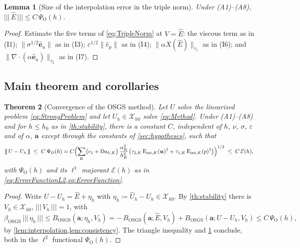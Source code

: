 \documentclass[11pt]{article}
\newtheorem{theorem}{Theorem}[section]
\newtheorem{lemma}[theorem]{Lemma}
\theoremstyle{remark}
\newcommand{\bu}{\boldsymbol{u}}
\newcommand{\ba}{\boldsymbol{a}}
\newcommand{\norm}[1]{\lVert #1 \rVert}
\newcommand{\tnorm}[1]{\lvert\!\lvert\!\lvert\, #1 \,\rvert\!\rvert\!\rvert}
\newcommand{\Eint}[2]{\mathrm{E}_{\mathrm{int},#1}(#2)}
\newcommand{\Dah}{\mathrm{Da}_{h,K}}
\newcommand{\Xhz}{\mathcal{X}_{h0}}
\begin{document}
\begin{lemma}[Size of the interpolation error in the triple norm]
\label{lem:interpsize}
Under \textup{(A1)--(A8)},
$\tnorm{\hat E} \le C\,\Psi_{\mathrm O}(h)$.
\end{lemma}

\begin{proof}
Estimate the five terms of \cref{eq:TripleNorm} at $V = \hat E$: the viscous term as
in (I1); $\norm{\sigma^{1/2}\hat{\boldsymbol e}_u}$ as in (I3);
$\varepsilon^{1/2}\norm{\hat e_p}$ as in (I4);
$\norm{\alpha X(\hat E)}_{\tau_1}$ as in (I6); and
$\norm{\nabla\cdot(\alpha\hat{\boldsymbol e}_u)}_{\tau_2}$ as in (I7).
\end{proof}

\subsection{Main theorem and corollaries}

\begin{theorem}[Convergence of the OSGS method]
\label{th:convergence}
Let $U$ solve the linearized problem \cref{eq:StrongProblem} and let
$U_h \in \Xhz$ solve \cref{eq:Method}. Under \textup{(A1)--(A8)} and for
$h \le h_0$ as in \cref{th:stability}, there is a constant $C$, independent of $h$,
$\nu$, $\sigma$, $\varepsilon$ and of $\alpha$, $\ba$ except through the constants of
\cref{sec:hypotheses}, such that
\begin{equation}
  \label{eq:MainResult}
  \tnorm{U - U_h}
  \;\le\;
  C\,\Psi_{\mathrm O}(h)
  = C\Bigl( \sum_K \bigl( c_1 + \Dah \bigr)\,\frac{\alpha_K^2}{h_K^2}
  \bigl( \tau_{2,K}\,\Eint{K}{\bu}^2 + \tau_{1,K}\,\Eint{K}{p}^2 \bigr) \Bigr)^{1/2}
  \;\le\; C\,\mathcal{E}(h),
\end{equation}
with $\Psi_{\mathrm O}(h)$ and its $\ell^1$ majorant $\mathcal{E}(h)$ as in
\cref{eq:ErrorFunctionL2,eq:ErrorFunction}.
\end{theorem}

\begin{proof}
Write $U - U_h = \hat E + \eta_h$ with $\eta_h \coloneqq \hat U_h - U_h \in \Xhz$.
By \cref{th:stability} there is $V_h \in \Xhz$, $\tnorm{V_h} = 1$, with
\[
  \beta_{\mathrm{OSGS}}\,\tnorm{\eta_h}
  \le B_{\mathrm{OSGS}}(\ba; \eta_h, V_h)
  = -\,B_{\mathrm{OSGS}}(\ba; \hat E, V_h)
  + B_{\mathrm{OSGS}}(\ba; U - U_h, V_h)
  \le C\,\Psi_{\mathrm O}(h),
\]
by \cref{lem:interpolation,lem:consistency}. The triangle inequality and
\cref{lem:interpsize} conclude, both in the $\ell^2$ functional $\Psi_{\mathrm O}(h)$.
\end{proof}
\end{document}
